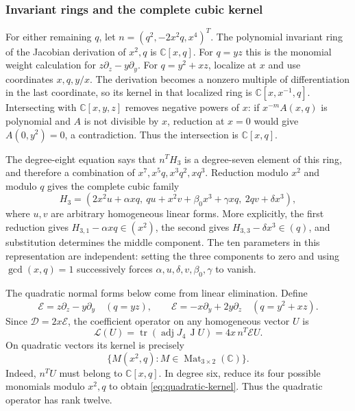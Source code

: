\documentclass[11pt,reqno]{amsart}
\numberwithin{equation}{section}
\theoremstyle{plain}
\theoremstyle{definition}
\theoremstyle{remark}
\newcommand{\C}{\mathbb C}
\newcommand{\tr}{\operatorname{tr}}
\newcommand{\adj}{\operatorname{adj}}
\newcommand{\J}{\operatorname J}
\newcommand{\calD}{\mathcal D}
\newcommand{\calE}{\mathcal E}
\begin{document}
\subsubsection{Invariant rings and the complete cubic kernel}
For either remaining $q$, let $n=(q^2,-2x^2q,x^4)^T$. The polynomial invariant ring of the Jacobian derivation of $x^2,q$ is $\C[x,q]$. For $q=yz$ this is the monomial weight calculation for $z\partial_z-y\partial_y$. For $q=y^2+xz$, localize at $x$ and use coordinates $x,q,y/x$. The derivation becomes a nonzero multiple of differentiation in the last coordinate, so its kernel in that localized ring is $\C[x,x^{-1},q]$. Intersecting with $\C[x,y,z]$ removes negative powers of $x$: if $x^{-m}A(x,q)$ is polynomial and $A$ is not divisible by $x$, reduction at $x=0$ would give $A(0,y^2)=0$, a contradiction. Thus the intersection is $\C[x,q]$.

The degree-eight equation says that $n^TH_3$ is a degree-seven element of this ring, and therefore a combination of $x^7,x^5q,x^3q^2,xq^3$. Reduction modulo $x^2$ and modulo $q$ gives the complete cubic family
\begin{equation}\label{eq:cubic-kernel}
H_3=(2x^2u+\alpha xq,\ qu+x^2v+\beta_0x^3+\gamma xq,\ 2qv+\delta x^3),
\end{equation}
where $u,v$ are arbitrary homogeneous linear forms. More explicitly, the first reduction gives $H_{3,1}-\alpha xq\in(x^2)$, the second gives $H_{3,3}-\delta x^3\in(q)$, and substitution determines the middle component. The ten parameters in this representation are independent: setting the three components to zero and using $\gcd(x,q)=1$ successively forces $\alpha,u,\delta,v,\beta_0,\gamma$ to vanish.

The quadratic normal forms below come from linear elimination. Define
\[
\calE=z\partial_z-y\partial_y\quad(q=yz),\qquad
\calE=-x\partial_y+2y\partial_z\quad(q=y^2+xz).
\]
Since $\calD=2x\calE$, the coefficient operator on any homogeneous vector $U$ is
\begin{equation}\label{eq:coefficient-operator}
\mathcal L(U)=\tr(\adj J_4\,\J U)=4x\,n^T\calE U.
\end{equation}
On quadratic vectors its kernel is precisely
\begin{equation}\label{eq:quadratic-kernel}
\{M(x^2,q):M\in\operatorname{Mat}_{3\times2}(\C)\}.
\end{equation}
Indeed, $n^TU$ must belong to $\C[x,q]$. In degree six, reduce its four possible monomials modulo $x^2,q$ to obtain \eqref{eq:quadratic-kernel}. Thus the quadratic operator has rank twelve.
\end{document}
